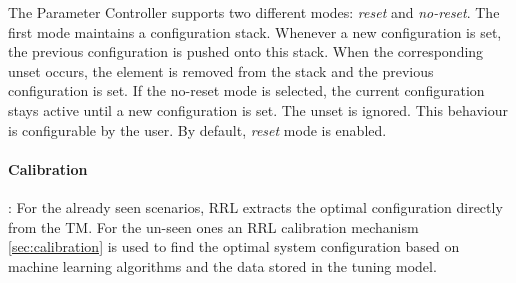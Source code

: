The Parameter Controller supports two different modes: \textit{reset} and \textit{no-reset}. The first mode maintains a configuration stack. Whenever a new configuration is set, the previous configuration is pushed onto this stack. When the corresponding unset occurs, the element is removed from the stack and the previous configuration is set. If the no-reset mode is selected, the current configuration stays active until a new configuration is set. The unset is ignored. This behaviour is configurable by the user. By default, \textit{reset} mode is enabled.

\paragraph{Calibration}: For the already seen scenarios, RRL extracts the optimal configuration directly from the TM. For the un-seen ones an RRL calibration mechanism \ref{sec:calibration} is used to find the optimal system configuration based on machine learning algorithms and the data stored in the tuning model. 

 